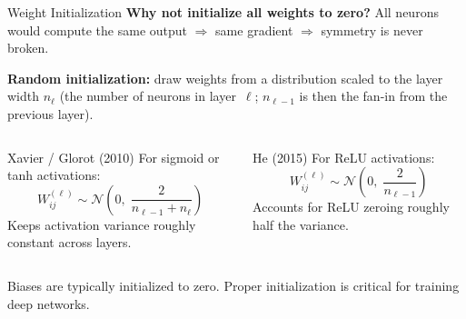 \documentclass[aspectratio=169,11pt]{beamer}
\begin{document}
\begin{frame}{Weight Initialization}
\textbf{Why not initialize all weights to zero?}
All neurons would compute the same output $\Rightarrow$ same gradient $\Rightarrow$ symmetry is never broken.

\vspace{0.12cm}
\textbf{Random initialization:} draw weights from a distribution scaled to the layer width $n_\ell$ (the number of neurons in layer~$\ell$; $n_{\ell-1}$ is then the fan-in from the previous layer).

\vspace{0.12cm}
\begin{columns}[T]
\begin{block}{Xavier / Glorot (2010)}
For sigmoid or tanh activations:
\[
    W_{ij}^{(\ell)} \sim \mathcal{N}\!\left(0,\; \frac{2}{n_{\ell-1} + n_{\ell}}\right)
\]
Keeps activation variance roughly constant across layers.
\end{block}

\begin{block}{He (2015)}
For ReLU activations:
\[
    W_{ij}^{(\ell)} \sim \mathcal{N}\!\left(0,\; \frac{2}{n_{\ell-1}}\right)
\]
Accounts for ReLU zeroing roughly half the variance.
\end{block}
\end{columns}

\vspace{0.1cm}
{\footnotesize Biases are typically initialized to zero. Proper initialization is critical for training deep networks.}
\end{frame}
\end{document}
